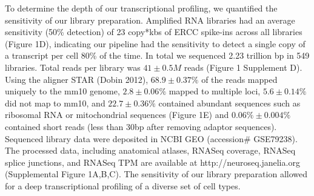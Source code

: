 To determine the depth of our transcriptional profiling, we quantified the sensitivity of our library preparation. Amplified RNA libraries had an average sensitivity (50\% detection) of 23 copy*kbs of ERCC spike-ins across all libraries (Figure 1D), indicating our pipeline had the sensitivity to detect a single copy of a transcript per cell 80\% of the time. In total we sequenced 2.23 trillion bp in 549 libraries. Total reads per library was $41\pm0.5M$ reads (Figure 1 Supplement D). Using the aligner STAR (Dobin 2012), $68.9\pm0.37\%$ of the reads mapped uniquely to the mm10 genome, $2.8\pm0.06\%$ mapped to multiple loci, $5.6\pm0.14\%$ did not map to mm10, and $22.7\pm0.36\%$ contained abundant sequences such as ribosomal RNA or mitochondrial sequences (Figure 1E) and $0.06\%\pm 0.004\%$ contained short reads (less than 30bp after removing adaptor sequences). Sequenced library data were deposited in NCBI GEO (accession\# GSE79238). The processed data, including anatomical atlases, RNASeq coverage, RNASeq splice junctions, and RNASeq TPM are available at http://neuroseq.janelia.org (Supplemental Figure 1A,B,C). The sensitivity of our library preparation allowed for a deep transcriptional profiling of a diverse set of cell types.


